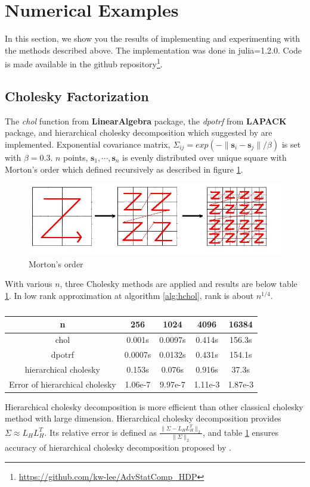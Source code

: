 \section{Numerical Examples}

In this section, we show you the results of implementing and experimenting with the methods described above. The implementation was done in julia=1.2.0. Code is made available in the github repository\footnote{\url{https://github.com/kw-lee/AdvStatComp_HDP}}.

\subsection{Cholesky Factorization}
The \textit{chol} function from \textbf{LinearAlgebra} package, the \textit{dpotrf} from \textbf{LAPACK} package, and hierarchical cholesky decomposition which suggested by \citet{hackbusch2015hierarchical} are implemented. Exponential covariance matrix, $\Sigma_{ij}=exp(-\lVert \mathbf{s}_i-\mathbf{s}_j \rVert/\beta)$ is set with $\beta=0.3$. $n$ points, $\mathbf{s}_1,\cdots,\mathbf{s}_n$ is evenly distributed over unique square with Morton's order which defined recursively as described in figure \ref{fig:morton}.

\begin{figure}[h]
\centering
	\includegraphics[width=.5\linewidth]{figs/Morton.jpg}
	\caption{Morton's order\citep{salem2016comparative}}
	\label{fig:morton}
\end{figure}

With various $n$, three Cholesky methods are applied and results are below table \ref{tab:table1}. In low rank approximation at algorithm \ref{alg:hchol}, rank is about $n^{1/4}$.

\begin{table}[h]
	\centering
	{
		\begin{tabular}{@{}ccccc@{}}
			\toprule
			n & 256 & 1024 & 4096 & 16384 \\ \midrule
			chol & 0.001s & 0.0097s & 0.414s & 156.3s \\
			dpotrf & 0.0007s & 0.0132s & 0.431s & 154.1s \\
			hierarchical cholesky & 0.153s & 0.076s & 0.916s & 37.3s \\
			Error of hierarchical cholesky & 1.06e-7 & 9.97e-7 & 1.11e-3 & 1.87e-3 \\  \bottomrule
		\end{tabular}%
	}
	\caption{}
	\label{tab:table1}
\end{table}
Hierarchical cholesky decomposition is more efficient than other classical cholesky method with large dimension. Hierarchical cholesky decomposition provides $\Sigma\approx L_HL_H^T$. Its relative error is defined as $\frac{\lVert\Sigma-L_HL_H^T\rVert_2}{\lVert\Sigma\rVert_2}$, and table \ref{tab:table1} ensures accuracy of hierarchical cholesky decomposition proposed by \citet{hackbusch2015hierarchical}.


